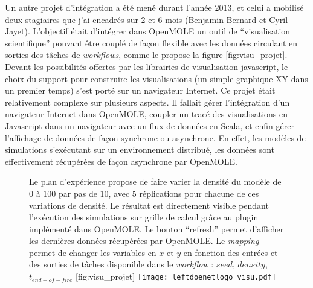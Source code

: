 Un autre projet d'intégration a été mené durant l'année 2013, et celui a mobilisé deux stagiaires que j'ai encadrés sur 2 et 6 mois (Benjamin Bernard et Cyril Jayet). L'objectif était d'intégrer dans OpenMOLE un outil de \enquote{visualisation scientifique} pouvant être couplé de façon flexible avec les données circulant en sorties des tâches de \textit{workflows}, comme le propose la figure \ref{fig:visu_projet}. Devant les possibilités offertes par les librairies de visualisation javascript, le choix du support pour construire les visualisations (un simple graphique XY dans un premier temps) s'est porté sur un navigateur Internet. Ce projet était relativement complexe sur plusieurs aspects. Il fallait gérer l'intégration d'un navigateur Internet dans OpenMOLE, coupler un tracé des visualisations en Javascript dans un navigateur avec un flux de données en Scala, et enfin gérer l'affichage de données de façon synchrone ou asynchrone. En effet, les modèles de simulations s'exécutant sur un environnement distribué, les données sont effectivement récupérées de façon asynchrone par OpenMOLE.

\begin{figure}[htbp]
	\begin{sidecaption}{Le plan d'expérience propose de faire varier la densité du modèle de $0$ à $100$ par pas de $10$, avec $5$ réplications pour chacune de ces variations de densité. Le résultat est directement visible pendant l'exécution des simulations sur grille de calcul grâce au plugin implémenté dans OpenMOLE. Le bouton \foreignquote{english}{refresh} permet d'afficher les dernières données récupérées par OpenMOLE. Le \textit{mapping} permet de changer les variables en $x$ et $y$ en fonction des entrées et des sorties de tâches disponible dans le \textit{workflow} : $seed$, $density$, $t_{end-of-fire}$ }[fig:visu_projet]
		\centering
		\texttt{[image: leftdoenetlogo\_visu.pdf]}
  \end{sidecaption}
\end{figure}

